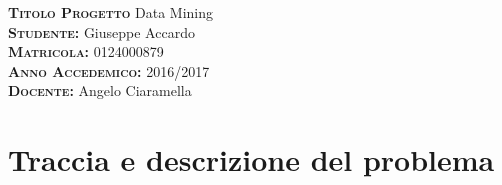 \documentclass[a4paper, oneside]{book}
\begin{document}
\begin{center}
	\large\textbf{\textsc{Titolo Progetto}} {  Data Mining} \\ \vspace{0.35cm}
	\large\textbf{\textsc{Studente:}} {Giuseppe Accardo} \\  
	\vspace{0.3cm}
	\large\textbf{\textsc{Matricola:}} { 0124000879} \\ 
	\vspace{0.3cm}
	\large\textbf{\textsc{Anno Accedemico:}} {2016/2017} \\
	\vspace{0.3cm}
	\large\textbf{\textsc{Docente:}} {Angelo Ciaramella} \\
\end{center}


\newpage

\newpage
\begingroup 
\let\clearpage\relax
	\let\cleardoublepage\relax
	\par\vspace{2\baselineskip}
		
\tableofcontents 
 \endgroup 

       
       
\pagestyle{myheadings} 
\chapter*{Traccia e descrizione del problema}
\pagestyle{myheadings} 

\large
\end{document}
